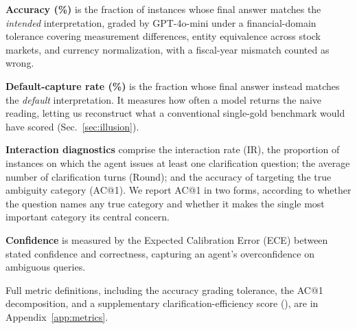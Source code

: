 \textbf{Accuracy (\%)} is the fraction of instances whose final answer matches the \emph{intended} interpretation, graded by GPT-4o-mini under a financial-domain tolerance covering measurement differences, entity equivalence across stock markets, and currency normalization, with a fiscal-year mismatch counted as wrong.

\textbf{Default-capture rate (\%)} is the fraction whose final answer instead matches the \emph{default} interpretation. It measures how often a model returns the naive reading, letting us reconstruct what a conventional single-gold benchmark would have scored (Sec.~\ref{sec:illusion}).

\textbf{Interaction diagnostics} comprise the interaction rate (IR), the proportion of instances on which the agent issues at least one clarification question; the average number of clarification turns (Round); and the accuracy of targeting the true ambiguity category (AC@1). We report AC@1 in two forms, according to whether the question names any true category and whether it makes the single most important category its central concern.

\textbf{Confidence} is measured by the Expected Calibration Error (ECE) between stated confidence and correctness, capturing an agent's overconfidence on ambiguous queries.

Full metric definitions, including the accuracy grading tolerance, the AC@1 decomposition, and a supplementary clarification-efficiency score (\disep), are in Appendix~\ref{app:metrics}.
